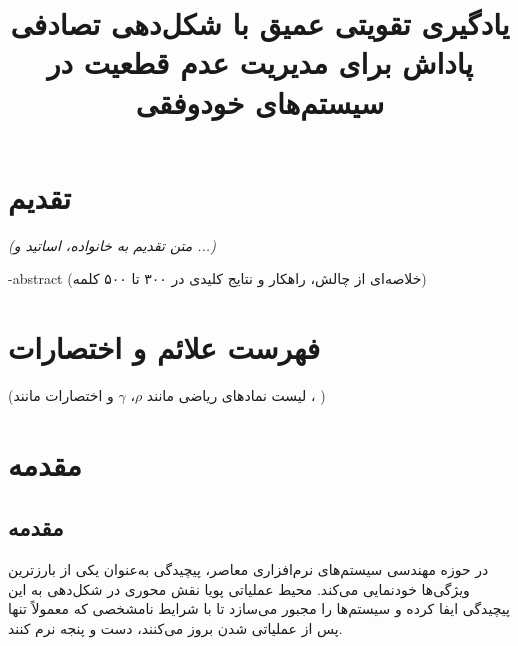 \documentclass[oneside,openany,phd]{TMU-Thesis}
\title{یادگیری تقویتی عمیق با شکل‌دهی تصادفی پاداش برای مدیریت عدم قطعیت در سیستم‌های خودوفقی}
\begin{document}
\AutoPersianDigits
{}

\firstPage
\besmPage
\davaranPage

\esalatPage
\mojavezPage

\chapter*{تقدیم}
\begin{center}
    \textit{(متن تقدیم به خانواده، اساتید و ...)}
\end{center}
\newpage


\fa-abstract{
(خلاصه‌ای از چالش، راهکار و نتایج کلیدی در ۳۰۰ تا ۵۰۰ کلمه)
}
\abstractPage

\tableofcontents
\newpage

\listoftables
\newpage

\listoffigures
\newpage

\chapter*{فهرست علائم و اختصارات}
(لیست نمادهای ریاضی مانند $\rho$، $\gamma$ و اختصارات مانند ، )
\newpage

\pagestyle{fancy}

\chapter{مقدمه}
\section{مقدمه}

در حوزه مهندسی سیستم‌های نرم‌افزاری معاصر، پیچیدگی به‌عنوان یکی از بارزترین ویژگی‌ها خودنمایی می‌کند. محیط عملیاتی پویا نقش محوری در شکل‌دهی به این پیچیدگی ایفا کرده و سیستم‌ها را مجبور می‌سازد تا با شرایط نامشخصی که معمولاً تنها پس از عملیاتی شدن بروز می‌کنند، دست و پنجه نرم کنند.
\end{document}
